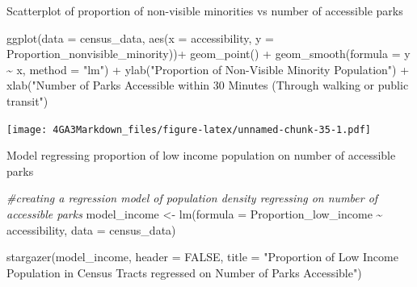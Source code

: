 \documentclass[
]{article}
\newenvironment{Shaded}{\begin{snugshade}}{\end{snugshade}}
\newcommand{\AttributeTok}[1]{\textcolor[rgb]{0.77,0.63,0.00}{#1}}
\newcommand{\CommentTok}[1]{\textcolor[rgb]{0.56,0.35,0.01}{\textit{#1}}}
\newcommand{\ConstantTok}[1]{\textcolor[rgb]{0.00,0.00,0.00}{#1}}
\newcommand{\FunctionTok}[1]{\textcolor[rgb]{0.00,0.00,0.00}{#1}}
\newcommand{\NormalTok}[1]{#1}
\newcommand{\OtherTok}[1]{\textcolor[rgb]{0.56,0.35,0.01}{#1}}
\newcommand{\SpecialCharTok}[1]{\textcolor[rgb]{0.00,0.00,0.00}{#1}}
\newcommand{\StringTok}[1]{\textcolor[rgb]{0.31,0.60,0.02}{#1}}
\begin{document}
Scatterplot of proportion of non-visible minorities vs number of
accessible parks

\begin{Shaded}
\begin{Highlighting}[]
\FunctionTok{ggplot}\NormalTok{(}\AttributeTok{data =}\NormalTok{ census\_data, }
       \FunctionTok{aes}\NormalTok{(}\AttributeTok{x =}\NormalTok{ accessibility, }
           \AttributeTok{y =}\NormalTok{ Proportion\_nonvisible\_minority))}\SpecialCharTok{+}
  \FunctionTok{geom\_point}\NormalTok{() }\SpecialCharTok{+}
  \FunctionTok{geom\_smooth}\NormalTok{(}\AttributeTok{formula =}\NormalTok{ y }\SpecialCharTok{\textasciitilde{}}\NormalTok{ x,}
              \AttributeTok{method =} \StringTok{"lm"}\NormalTok{) }\SpecialCharTok{+}
  \FunctionTok{ylab}\NormalTok{(}\StringTok{"Proportion of Non{-}Visible Minority Population"}\NormalTok{) }\SpecialCharTok{+}
  \FunctionTok{xlab}\NormalTok{(}\StringTok{"Number of Parks Accessible within 30 Minutes (Through walking or public transit"}\NormalTok{) }
\end{Highlighting}
\end{Shaded}

\texttt{[image: 4GA3Markdown\_files/figure-latex/unnamed-chunk-35-1.pdf]}

Model regressing proportion of low income population on number of
accessible parks

\begin{Shaded}
\begin{Highlighting}[]
\CommentTok{\#creating a regression model of population density regressing on number of accessible parks}
\NormalTok{model\_income }\OtherTok{\textless{}{-}} \FunctionTok{lm}\NormalTok{(}\AttributeTok{formula =}\NormalTok{ Proportion\_low\_income }\SpecialCharTok{\textasciitilde{}}\NormalTok{ accessibility, }
             \AttributeTok{data =}\NormalTok{ census\_data)}

\FunctionTok{stargazer}\NormalTok{(model\_income,}
          \AttributeTok{header =} \ConstantTok{FALSE}\NormalTok{,}
          \AttributeTok{title =} \StringTok{"Proportion of Low Income Population in Census Tracts regressed on Number of Parks Accessible"}\NormalTok{)}
\end{Highlighting}
\end{Shaded}
\end{document}
